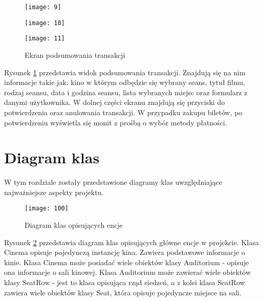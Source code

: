 \newpage
\begin{figure}[h]
\centering
\begin{minipage}{.33\textwidth}
  \centering
  \texttt{[image: 9]}
\end{minipage}%
\begin{minipage}{.33\textwidth}
  \centering
  \texttt{[image: 10]}
\end{minipage}
\begin{minipage}{.33\textwidth}
  \centering
  \texttt{[image: 11]}
\end{minipage}
\caption{Ekran podsumowania transakcji}
\label{podsumowanie}
\end{figure}

Rysunek \ref{podsumowanie} przedstawia widok podsumowania transakcji. Znajdują się na nim informacje takie jak: kino w którym odbędzie się wybrany seans, tytuł filmu, rodzaj seansu, data i godzina seansu, lista wybranych miejsc oraz formularz z danymi użytkownika. W dolnej części ekranu znajdują się przyciski do potwierdzenia oraz anulowania transakcji. W przypadku zakupu biletów, po potwierdzeniu wyświetla się monit z prośbą o wybór metody płatności.
\newpage
\section{Diagram klas}
W tym rozdziale zostały przedstawione diagramy klas uwzględniające najważniejsze aspekty projektu.
\begin{figure}[h]
\centering
\texttt{[image: 100]}
\caption{Diagram klas opisujących encje}
\label{klasy1}
\end{figure}
\par
Rysunek \ref{klasy1} przedstawia diagram klas opisujących główne encje w projekcie. Klasa Cinema opisuje pojedynczą instancję kina. Zawiera podstawowe informacje o kinie. Klasa Cinema może posiadać wiele obiektów klasy Auditorium - opisuje ona informacje o sali kinowej. Klasa Auditorium może zawierać wiele obiektów klasy SeatRow - jest to klasa opisująca rząd siedzeń, a z kolei klasa SeatRow zawiera wiele obiektów klasy Seat, która opisuje pojedyncze miejsce na sali.

